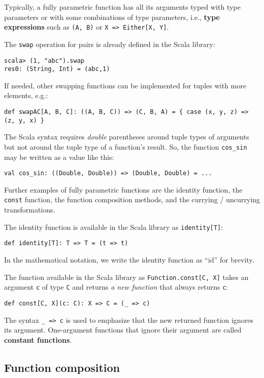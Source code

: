 Typically, a fully parametric function has all its arguments typed
with type parameters or with some combinations of type parameters,
i.e., \textbf{type expressions} such as \lstinline!(A, B)!
or \lstinline!X => Either[X, Y]!.

The \lstinline!swap! operation for pairs is already defined in the
Scala library:
\begin{lstlisting}
scala> (1, "abc").swap
res0: (String, Int) = (abc,1)
\end{lstlisting}
If needed, other swapping functions can be implemented for tuples
with more elements, e.g.:
\begin{lstlisting}
def swapAC[A, B, C]: ((A, B, C)) => (C, B, A) = { case (x, y, z) => (z, y, x) }
\end{lstlisting}
The Scala syntax requires \emph{double} parentheses around tuple types
of arguments but not around the tuple type of a function\textsf{'}s result.
So, the function \lstinline!cos_sin! may be written as a value like
this:
\begin{lstlisting}
val cos_sin: ((Double, Double)) => (Double, Double) = ...
\end{lstlisting}

Further examples of fully parametric functions are the identity function,
the \lstinline!const! function, the function composition methods,
and the currying / uncurrying transformations. 

The identity function is available in the
Scala library as \lstinline!identity[T]!:
\begin{lstlisting}
def identity[T]: T => T = (t => t)
\end{lstlisting}
In the mathematical notation, we write the identity function as \textsf{``}$\text{id}$\textsf{''}
for brevity.

The function available in the Scala library as \lstinline!Function.const[C, X]!
takes an argument \lstinline!c! of type \lstinline!C! and returns
\emph{a new function} that always returns \lstinline!c!:
\begin{lstlisting}
def const[C, X](c: C): X => C = (_ => c)
\end{lstlisting}
The syntax \lstinline!_ => c! is used to emphasize that the new returned
function ignores its argument. One-argument functions that ignore
their argument are called \textbf{constant functions}.

\subsection{Function composition\label{subsec:Examples-of-fully-parametric}}

